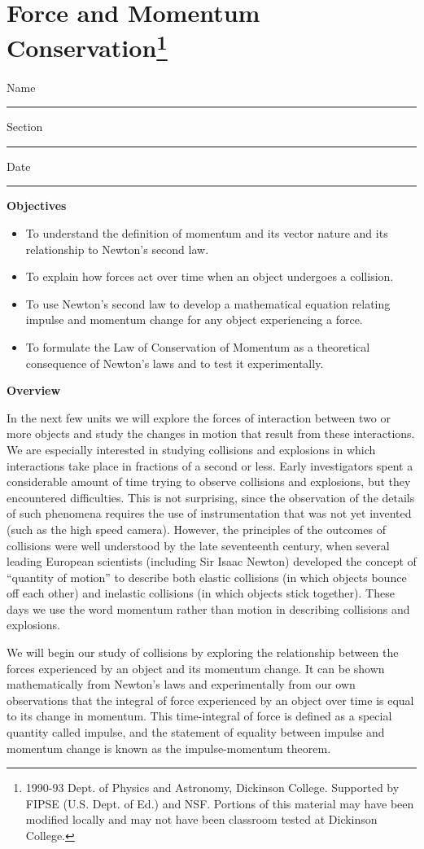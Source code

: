 \section{Force and Momentum Conservation\footnote{
1990-93 Dept. of Physics and Astronomy, Dickinson College. Supported by FIPSE
(U.S. Dept. of Ed.) and NSF. Portions of this material may have been modified
locally and may not have been classroom tested at Dickinson College.
}}

Name \rule{2.0in}{0.1pt}\hfill{}Section \rule{1.0in}{0.1pt}\hfill{}Date \rule{1.0in}{0.1pt}

\textbf{Objectives} 

\begin{itemize}
\item To understand the definition of momentum and its vector nature and its relationship
to Newton's second law. 
\item To explain how forces act over time when an object undergoes a collision. 
\item To use Newton's second law to develop a mathematical equation relating impulse
and momentum change for any object experiencing a force.
\item To formulate the Law of Conservation of Momentum as a theoretical consequence
of Newton's laws and to test it experimentally.
\end{itemize}
\textbf{Overview }

In the next few units we will explore the forces of interaction between two
or more objects and study the changes in motion that result from these interactions.
We are especially interested in studying collisions and explosions in which
interactions take place in fractions of a second or less. Early investigators
spent a considerable amount of time trying to observe collisions and explosions,
but they encountered difficulties. This is not surprising, since the observation
of the details of such phenomena requires the use of instrumentation that was
not yet invented (such as the high speed camera). However, the principles of
the outcomes of collisions were well understood by the late seventeenth century,
when several leading European scientists (including Sir Isaac Newton) developed
the concept of ``quantity of motion'' 
to describe both elastic collisions (in which
objects bounce off each other) and inelastic collisions (in which objects stick
together). These days we use the word momentum rather than motion in describing
collisions and explosions.

We will begin our study of collisions by exploring the relationship between
the forces experienced by an object and its momentum change. It can be shown
mathematically from Newton's laws and experimentally from our own observations
that the integral of force experienced by an object over time is equal to its
change in momentum. This time-integral of force is defined as a special quantity
called impulse, and the statement of equality between impulse and momentum change
is known as the impulse-momentum theorem.

